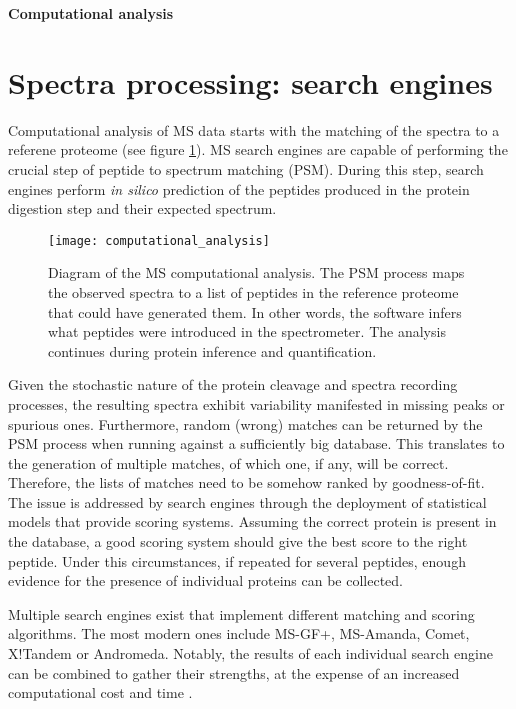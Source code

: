  
\LARGE
\textbf{Computational analysis}
\normalsize

\section{Spectra processing: search engines}
\label{sec:search_engines}

Computational analysis of MS data starts with the matching of the spectra to a referene proteome (see figure \ref{fig:computational_analysis}). \ac{MS} search engines are capable of performing the crucial step of peptide to spectrum matching (PSM). During this step, search engines perform \textit{in silico} prediction of the peptides produced in the protein digestion step and their expected spectrum.


\begin{figure}[!h]
\texttt{[image: computational\_analysis]}
\caption{Diagram of the MS computational analysis. The PSM process maps the observed spectra to a list of peptides in the reference proteome that could have generated them. In other words, the software infers what peptides were introduced in the spectrometer. The analysis continues during protein inference and quantification.}
\label{fig:computational_analysis}
\end{figure}


Given the stochastic nature of the protein cleavage and spectra recording processes, the resulting spectra exhibit variability manifested in missing peaks or spurious ones. Furthermore, random (wrong) matches can be returned by the PSM process when running against a sufficiently big database. This translates to the generation of multiple matches, of which one, if any, will be correct. Therefore, the lists of matches need to be somehow ranked by goodness-of-fit. The issue is addressed by search engines through the deployment of statistical models that provide scoring systems. Assuming the correct protein is present in the database, a good scoring system should give the best score to the right peptide. Under this circumstances, if repeated for several peptides, enough evidence for the presence of individual proteins can be collected.

Multiple search engines exist that implement different matching and scoring algorithms. The most modern ones include MS-GF+, MS-Amanda, Comet, X!Tandem or Andromeda. Notably, the results of each individual search engine can be combined to gather their strengths, at the expense of an increased computational cost and time \cite{Shteynberg2013}.



